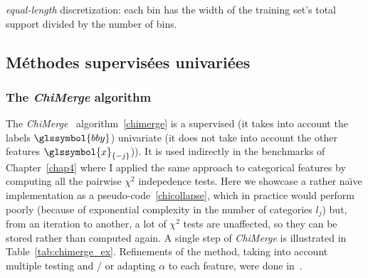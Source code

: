\begin{algorithm}[H]
 \KwResult{$\hat{\q}$}
 \For{$j=1$ to $d$}{
Let $w_j = \max{i} x_{i,j} - \min{i} x_{i,j}$\;
Let $c_0=-\infty$, $c_{m_j} = + \infty$ and $c_{j,h} = \frac{w_j \cdot h}{m_j} + \min{i} x_{i,j}$\;
Let $C_{j,h} = ]c_{j,h-1};c_{j,h}]$ and $\hat{\q}_j(\cdot) = (\hat{q}_{j,h}(\cdot))_1^{m_j}$\;
Set $\hat{q}_{j,h}(\cdot)=\mathds{1}_{C_{j,h}}(\cdot)$.
}
 \caption{\label{equal-length-disc} \textit{equal-length} discretization: each bin has the width of the training set's total support divided by the number of bins.}
\end{algorithm}



\subsection{Méthodes supervisées univariées}

\subsubsection{The \textit{ChiMerge} algorithm}

The \textit{ChiMerge}~\cite{kerber1992chimerge} algorithm~\ref{chimerge} is a supervised (it takes into account the labels $\glssymbol{bby}$) univariate (it does not take into account the other features $\glssymbol{x}_{\{-j\}}$)). It is used indirectly in the benchmarks of Chapter~\ref{chap4} where I applied the same approach to categorical features by computing all the pairwise $\chi^2$ indepedence tests. Here we showcase a rather na\"{\i}ve implementation as a pseudo-code~\ref{chicollapse}, which in practice would perform poorly (because of exponential complexity in the number of categories $l_j$) but, from an iteration to another, a lot of $\chi^2$ tests are unaffected, so they can be stored rather than computed again. A single step of \textit{ChiMerge} is illustrated in Table~\ref{tab:chimerge_ex}. Refinements of the method, taking into account multiple testing and / or adapting $\alpha$ to each feature, were done in~\cite{}.

